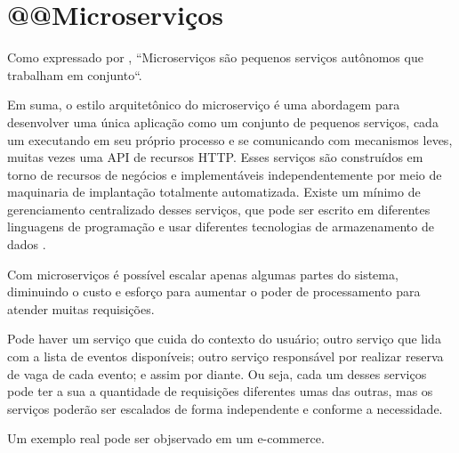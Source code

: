 \chapter{@@Microserviços}\label{microservicos}

Como expressado por
\cite{building-microservices}, ``Microserviços são pequenos serviços
autônomos que trabalham em conjunto``.

\begin{citacao}
Em suma, o estilo arquitetônico do microserviço é uma abordagem para desenvolver
uma única aplicação como um conjunto de pequenos serviços, cada um executando em seu próprio processo e se comunicando
com mecanismos leves, muitas vezes uma API de recursos HTTP. Esses serviços são construídos em torno de recursos de
negócios e implementáveis independentemente por meio de maquinaria de implantação totalmente automatizada.
Existe um mínimo de gerenciamento centralizado desses serviços, que pode ser escrito em diferentes linguagens de
programação e usar diferentes tecnologias de armazenamento de dados \cite{martin-fowler-microservices}.
\end{citacao}

Com microserviços é possível escalar apenas algumas partes do sistema, diminuindo
o custo e esforço para aumentar o poder de processamento para atender muitas requisições.

Pode haver um serviço que cuida do contexto do usuário; outro serviço que lida com a
lista de eventos disponíveis; outro serviço responsável por realizar reserva de vaga de
cada evento; e assim por diante. Ou seja, cada um desses serviços pode ter a sua a quantidade
de requisições diferentes umas das outras, mas os serviços poderão ser escalados de forma
independente e conforme a necessidade.

Um exemplo real pode ser objservado em um e-commerce.


